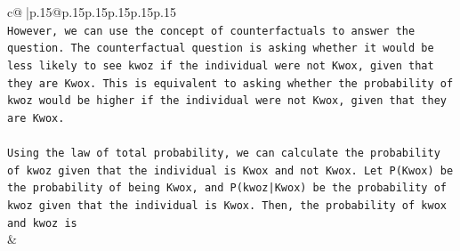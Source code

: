 \documentclass{article}
\begin{document}
{\begin{supertabular}{c@{$\;$}|p{.15\linewidth}@{}p{.15\linewidth}p{.15\linewidth}p{.15\linewidth}p{.15\linewidth}p{.15\linewidth}}
{{{\\ 
\texttt{However, we can use the concept of counterfactuals to answer the question. The counterfactual question is asking whether it would be less likely to see kwoz if the individual were not Kwox, given that they are Kwox. This is equivalent to asking whether the probability of kwoz would be higher if the individual were not Kwox, given that they are Kwox.} \\
\\ 
\texttt{Using the law of total probability, we can calculate the probability of kwoz given that the individual is Kwox and not Kwox. Let P(Kwox) be the probability of being Kwox, and P(kwoz|Kwox) be the probability of kwoz given that the individual is Kwox. Then, the probability of kwox and kwoz is} \\
            }
        }
    }
    & \\ \\


\end{supertabular}}
\end{document}
